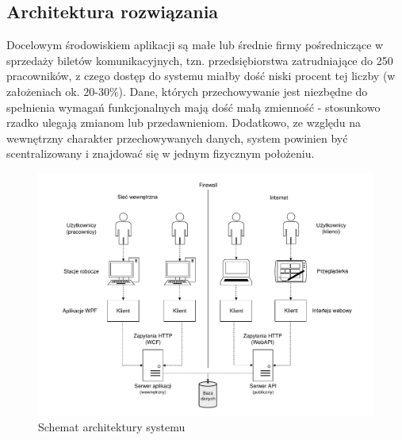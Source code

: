 \documentclass[10pt,a4paper]{article}
\begin{document}
\subsection{Architektura rozwiązania}
Docelowym środowiskiem aplikacji są małe lub średnie firmy pośredniczące w sprzedaży biletów komunikacyjnych, tzn. przedsiębiorstwa zatrudniające do 250 pracowników, z czego dostęp do systemu miałby dość niski procent tej liczby (w założeniach ok. 20-30\%). Dane, których przechowywanie jest niezbędne do spełnienia wymagań funkcjonalnych mają dość małą zmienność - stosunkowo rzadko ulegają zmianom lub przedawnieniom. Dodatkowo, ze względu na wewnętrzny charakter przechowywanych danych, system powinien być scentralizowany i znajdować się w jednym fizycznym położeniu.
\begin{figure}[H]
	\centering
	\includegraphics[width=15.5cm]{Resources/PDF/architecture-global.pdf}
	\caption{Schemat architektury systemu}
\end{figure}
\end{document}
